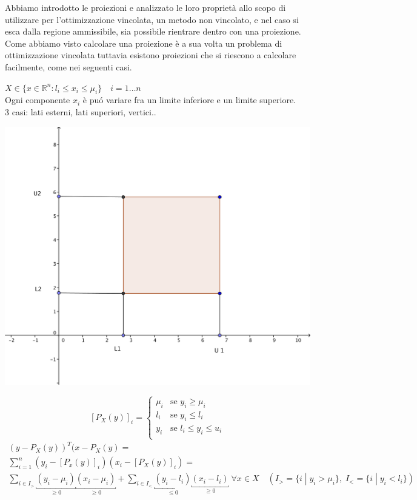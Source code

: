 Abbiamo introdotto le proiezioni e analizzato le loro proprietà allo
scopo di utilizzare per l'ottimizzazione vincolata, un metodo non
vincolato, e nel caso si esca dalla regione ammissibile, sia possibile
rientrare dentro con una proiezione.\\
Come abbiamo visto calcolare una proiezione è a sua volta un problema
di ottimizzazione vincolata tuttavia esistono proiezioni che si
riescono a calcolare facilmente, come nei seguenti casi.

\begin{example}
$X \in \{ x \in \mathbb{R}^{n} : l_i \leq x_i \leq \mu_i \}
\quad
i =1 \ldots n
$\\
Ogni componente $x_i$ \`e pu\'o variare fra un limite inferiore e un limite superiore.\\
3 casi:
lati esterni, lati superiori, vertici..

\begin{center}
  \includegraphics[scale=0.8]{imgs/vincoloscatola.png}
\end{center}


$$[P_{X} (y)]_{i} =
\left\{
\begin{array}{ll}
\mu_i & \text{se } y_i \geq \mu_i \\
l_i & \text{se } y_i \leq l_i \\
y_i & \text{se } l_i \leq y_i \leq u_i \\
\end{array}
\right.
$$
$$
\begin{array}{l}
(y - P_{X}(y))^{T}(x- P_X(y) = \\
\displaystyle \sum_{i=1}^{n}(y_i - [P_x(y)]_{i})(x_i-[P_{X}(y)]_i)
= \\
 \displaystyle \sum_{i \in I_{>}}
\underbracket{(y_i - \mu_i)}_{\geq 0} \underbracket{(x_i - \mu_i)}_{\ge 0}
+
\displaystyle \sum_{i \in I_{<}}
\underbracket{(y_i - l_i)}_{\le 0} \underbracket{(x_i - l_i)}_{\geq 0}   
\; \forall x \in X \quad (I_{>} = \{ i \; | \; y_i > \mu_i \}, \;
I_{<} = \{ i \; | \; y_i < l_i \} )
\end{array}
$$
\end{example}

